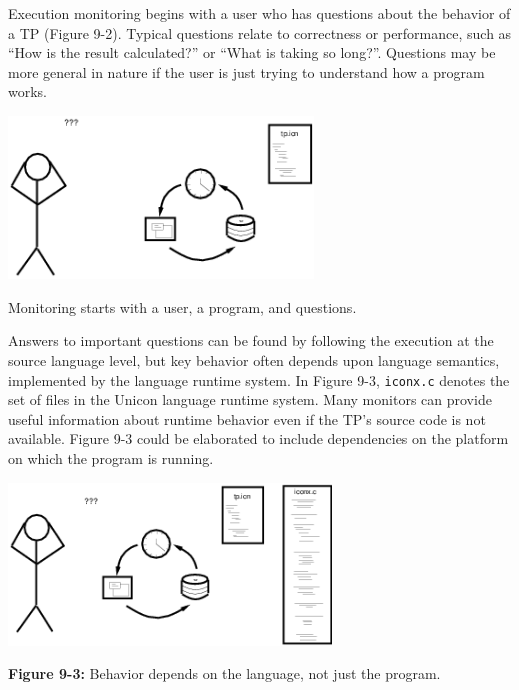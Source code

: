 \bigskip

Execution monitoring begins with a user who has questions about the behavior
of a TP (Figure 9-2). Typical questions relate to correctness or performance,
such as ``How is the result calculated?'' or ``What is taking so long?''.
Questions may be more general in nature if the user is just trying to
understand how a program works.

\begin{center}
  \includegraphics[height=1.7in]{scene1.png}
\end{center}
\vspace{-0.25cm}{\sffamily\bfseries Figure 9-2:}
{\sffamily Monitoring starts with a user, a program, and questions.}

\bigskip

Answers to important questions can be found by following the execution at
the source language level, but key behavior often depends upon language
semantics, implemented by the language runtime system.  In Figure 9-3,
{\tt iconx.c} denotes the set of files in the Unicon language runtime
system. Many monitors can
provide useful information about runtime behavior even if the TP's source
code is not available.  Figure 9-3 could be elaborated to include
dependencies on the platform on which the program is running.

\begin{center}
\includegraphics[height=1.7in]{scene2.png}
\end{center}

{\sffamily\bfseries Figure 9-3:}
{\sffamily Behavior depends on the language, not just the program.}

